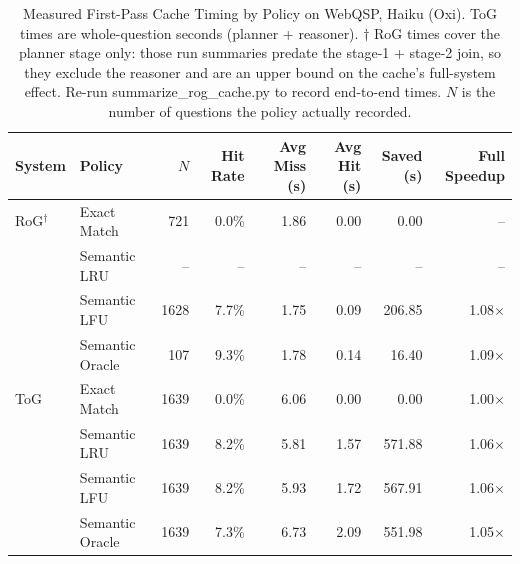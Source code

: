 \begin{table}[htbp]
\centering
\caption{Measured First-Pass Cache Timing by Policy on WebQSP, Haiku (Oxi). ToG times are whole-question seconds (planner + reasoner). $\dagger$ RoG times cover the planner stage only: those run summaries predate the stage-1 + stage-2 join, so they exclude the reasoner and are an upper bound on the cache's full-system effect. Re-run summarize\_rog\_cache.py to record end-to-end times. $N$ is the number of questions the policy actually recorded.}
\label{tab:live_cache_timing_webqsp_haiku_oxi}
\begin{tabular}{llrrrrrr}
\hline
\textbf{System} & \textbf{Policy} & \textbf{$N$} & \textbf{Hit Rate} & \textbf{Avg Miss (s)} & \textbf{Avg Hit (s)} & \textbf{Saved (s)} & \textbf{Full Speedup} \\
\hline
RoG$^{\dagger}$ & Exact Match      & 721 & 0.0\% & 1.86 & 0.00 & 0.00 & -- \\
     & Semantic LRU     & -- & -- & -- & -- & -- & -- \\
     & Semantic LFU     & 1628 & 7.7\% & 1.75 & 0.09 & 206.85 & 1.08$\times$ \\
     & Semantic Oracle  & 107 & 9.3\% & 1.78 & 0.14 & 16.40 & 1.09$\times$ \\
\hline
ToG  & Exact Match      & 1639 & 0.0\% & 6.06 & 0.00 & 0.00 & 1.00$\times$ \\
     & Semantic LRU     & 1639 & 8.2\% & 5.81 & 1.57 & 571.88 & 1.06$\times$ \\
     & Semantic LFU     & 1639 & 8.2\% & 5.93 & 1.72 & 567.91 & 1.06$\times$ \\
     & Semantic Oracle  & 1639 & 7.3\% & 6.73 & 2.09 & 551.98 & 1.05$\times$ \\
\hline
\end{tabular}
\end{table}

